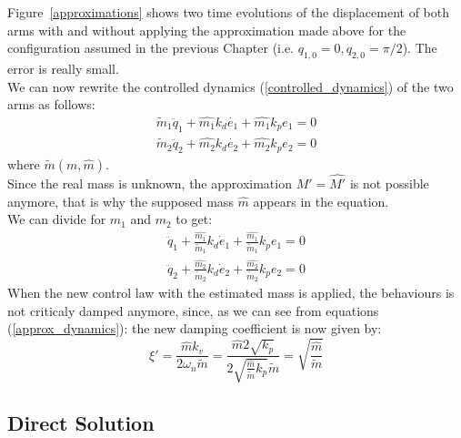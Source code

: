 \documentclass[a4paper,12pt,oneside]{report}
\begin{document}
Figure~\ref{approximations} shows two time evolutions of the displacement of both arms with and without applying the approximation made above for the configuration assumed in the previous Chapter (i.e. $q_{1,0}=0,q_{2,0}=\pi/2$). The error is really small.\\
We can now rewrite the controlled dynamics (\ref{controlled_dynamics}) of the two arms as follows:
\begin{equation}
  \begin{array}{l}
    \tilde{m}_1\ddot{q}_1+\hat{m_1}k_d\dot{e_1}+\hat{m_1}k_p e_1=0\\
    \tilde{m}_2\ddot{q}_2+\hat{m_2}k_d\dot{e_2}+\hat{m_2}k_p e_2=0
  \end{array}
\end{equation}
where $\tilde{m}(m,\hat{m})$.\\
Since the real mass is unknown, the approximation $M'=\hat{M'}$ is not possible anymore, that is why the supposed mass $\hat{m}$ appears in the equation.\\
We can divide for $m_1$ and $m_2$ to get:
\begin{equation}
  \begin{array}{l}
    \ddot{q}_1+\frac{\hat{m_1}}{\tilde{m}_1}k_d\dot{e}_1+\frac{\hat{m_1}}{\tilde{m}_1}k_p e_1=0\\
    \ddot{q}_2+\frac{\hat{m_2}}{\tilde{m}_2}k_d\dot{e}_2+\frac{\hat{m_2}}{\tilde{m}_2}k_p e_2=0
  \end{array}
  \label{approx_dynamics}
\end{equation}
When the new control law with the estimated mass is applied, the behaviours is not criticaly damped anymore, since, as we can see from equations (\ref{approx_dynamics}): the new damping coefficient is now given by:
\begin{equation}
  \xi'=\frac{\hat{m}k_v}{2\omega_n \tilde{m}}=\frac{\hat{m}2\sqrt{k_p}}{2\sqrt{\frac{\hat{m}}{\tilde{m}}k_p} \tilde{m}}=\sqrt{\frac{\hat{m}}{\tilde{m}}}
  \label{mass_relation}
\end{equation}
\newpage
\subsection{Direct Solution}
\end{document}
